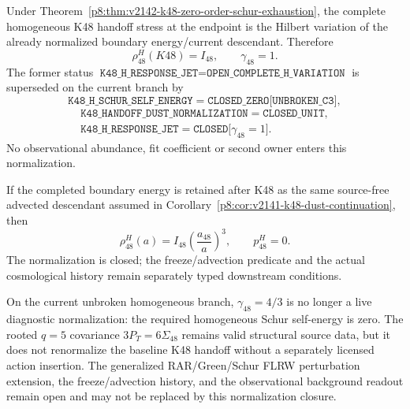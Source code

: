\documentclass[12pt,a4paper]{article}
\begin{document}
\begin{corollary}
\label{p8:cor:v2142-k48-gamma-unit}
Under Theorem~\ref{p8:thm:v2142-k48-zero-order-schur-exhaustion}, the complete
homogeneous K48 handoff stress at the endpoint is the Hilbert variation of the
already normalized boundary energy/current descendant.  Therefore
\[
 \boxed{\rho_{48}^{H}(K48)=I_{48},
 \qquad \gamma_{48}=1.}
\]
The former status
$\texttt{K48\_H\_RESPONSE\_JET}=\texttt{OPEN\_COMPLETE\_H\_VARIATION}$ is
superseded on the current branch by
\[
 \boxed{\texttt{K48\_H\_SCHUR\_SELF\_ENERGY}
 =\texttt{CLOSED\_ZERO[UNBROKEN\_C3]},}
\]
\[
 \boxed{\begin{gathered}
 \texttt{K48\_HANDOFF\_DUST\_NORMALIZATION}
 =\texttt{CLOSED\_UNIT},\\
 \texttt{K48\_H\_RESPONSE\_JET}
 =\texttt{CLOSED[}\gamma_{48}=1\texttt{]}.
 \end{gathered}}
\]
No observational abundance, fit coefficient or second owner enters this
normalization.
\end{corollary}

\begin{corollary}
\label{p8:cor:v2142-k48-unit-dust-continuation}
If the completed boundary energy is retained after K48 as the same source-free
advected descendant assumed in
Corollary~\ref{p8:cor:v2141-k48-dust-continuation}, then
\[
 \boxed{
 \rho_{48}^{H}(a)=I_{48}\left(\frac{a_{48}}a\right)^3,
 \qquad p_{48}^{H}=0.}
\]
The normalization is closed; the freeze/advection predicate and the actual
cosmological history remain separately typed downstream conditions.
\end{corollary}

\begin{remark}
\label{p8:rem:v2142-k48-normalization-retirements}
On the current unbroken homogeneous branch, $\gamma_{48}=4/3$ is no longer a
live diagnostic normalization: the required homogeneous Schur self-energy is
zero.  The rooted $q=5$ covariance $3P_T=6\Sigma_{48}$ remains valid structural
source data, but it does not renormalize the baseline K48 handoff without a
separately licensed action insertion.  The generalized RAR/Green/Schur FLRW
perturbation extension, the freeze/advection history, and the observational
background readout remain open and may not be replaced by this normalization
closure.
\end{remark}
\end{document}

